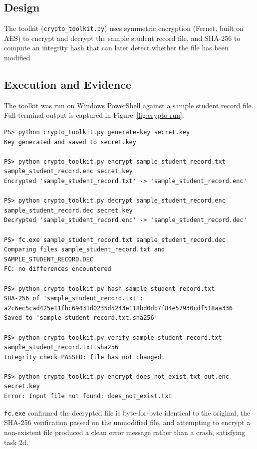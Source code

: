 \documentclass[11pt]{article}
\begin{document}
\subsection{Design}
The toolkit (\texttt{crypto\_toolkit.py}) uses symmetric encryption (Fernet, built on AES) to
encrypt and decrypt the sample student record file, and SHA-256 to compute an integrity
hash that can later detect whether the file has been modified.

\subsection{Execution and Evidence}

The toolkit was run on Windows PowerShell against a sample student record file. Full terminal
output is captured in Figure~\ref{fig:crypto-run}.

\begin{lstlisting}
PS> python crypto_toolkit.py generate-key secret.key
Key generated and saved to secret.key

PS> python crypto_toolkit.py encrypt sample_student_record.txt sample_student_record.enc secret.key
Encrypted 'sample_student_record.txt' -> 'sample_student_record.enc'

PS> python crypto_toolkit.py decrypt sample_student_record.enc sample_student_record.dec secret.key
Decrypted 'sample_student_record.enc' -> 'sample_student_record.dec'

PS> fc.exe sample_student_record.txt sample_student_record.dec
Comparing files sample_student_record.txt and SAMPLE_STUDENT_RECORD.DEC
FC: no differences encountered

PS> python crypto_toolkit.py hash sample_student_record.txt
SHA-256 of 'sample_student_record.txt': a2c6ec5cad425e11fbc69431d0235d5243e118bd0db7f84e57930cdf518aa336
Saved to 'sample_student_record.txt.sha256'

PS> python crypto_toolkit.py verify sample_student_record.txt sample_student_record.txt.sha256
Integrity check PASSED: file has not changed.

PS> python crypto_toolkit.py encrypt does_not_exist.txt out.enc secret.key
Error: Input file not found: does_not_exist.txt
\end{lstlisting}

\texttt{fc.exe} confirmed the decrypted file is byte-for-byte identical to the original,
the SHA-256 verification passed on the unmodified file, and attempting to encrypt a
non-existent file produced a clean error message rather than a crash, satisfying task 2d.
\end{document}
